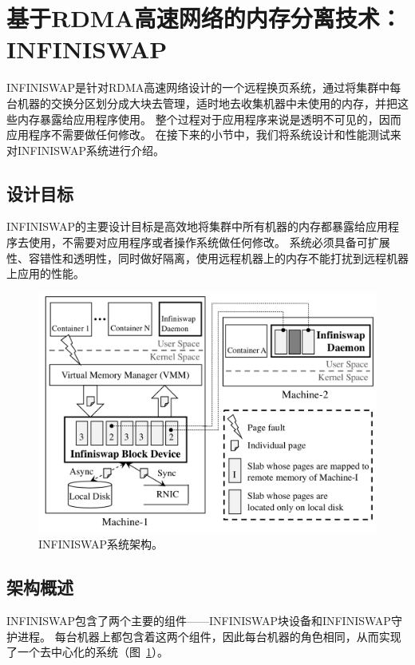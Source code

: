 
\section{基于RDMA高速网络的内存分离技术：INFINISWAP}

INFINISWAP是针对RDMA高速网络设计的一个远程换页系统，通过将集群中每台机器的交换分区划分成大块去管理，适时地去收集机器中未使用的内存，并把这些内存暴露给应用程序使用。
整个过程对于应用程序来说是透明不可见的，因而应用程序不需要做任何修改。
在接下来的小节中，我们将系统设计和性能测试来对INFINISWAP系统进行介绍。

\subsection{设计目标}
INFINISWAP的主要设计目标是高效地将集群中所有机器的内存都暴露给应用程序去使用，不需要对应用程序或者操作系统做任何修改。
系统必须具备可扩展性、容错性和透明性，同时做好隔离，使用远程机器上的内存不能打扰到远程机器上应用的性能。

\begin{figure}
\centering
\includegraphics[scale=0.5]{Figures/memory/infiniswap_architecture.png}
\decoRule
\caption{INFINISWAP系统架构。}
\label{fig:infiniswap_architecture}
\end{figure}

\subsection{架构概述}
INFINISWAP包含了两个主要的组件——INFINISWAP块设备和INFINISWAP守护进程。
每台机器上都包含着这两个组件，因此每台机器的角色相同，从而实现了一个去中心化的系统（图~\ref{fig:infiniswap_architecture}）。

